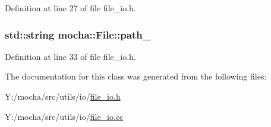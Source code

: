 Definition at line 27 of file file\_\-io.h.

\hypertarget{classmocha_1_1_file_ab9331e1a837f5d7b73925b9c836bc754}{
\subsubsection[{path\_\-}]{\setlength{\rightskip}{0pt plus 5cm}std::string {\bf mocha::File::path\_\-}}}
\label{classmocha_1_1_file_ab9331e1a837f5d7b73925b9c836bc754}


Definition at line 33 of file file\_\-io.h.



The documentation for this class was generated from the following files:\begin{DoxyCompactItemize}
\item 
Y:/mocha/src/utils/io/\hyperlink{file__io_8h}{file\_\-io.h}\item 
Y:/mocha/src/utils/io/\hyperlink{file__io_8cc}{file\_\-io.cc}\end{DoxyCompactItemize}
